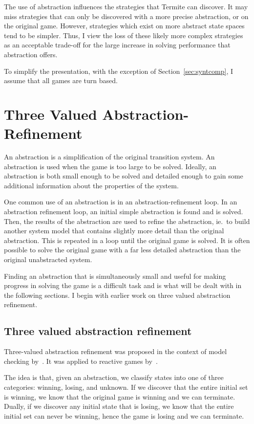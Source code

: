 The use of abstraction influences the strategies that Termite can discover. It may miss strategies that can only be discovered with a more precise abstraction, or on the original game. However, strategies which exist on more abstract state spaces tend to be simpler. Thus, I view the loss of these likely more complex strategies as an acceptable trade-off for the large increase in solving performance that abstraction offers.

To simplify the presentation, with the exception of Section~\ref{sec:syntcomp}, I assume that all games are turn based.



\section{Three Valued Abstraction-Refinement}
An abstraction is a simplification of the original transition system. An abstraction is used when the game is too large to be solved. Ideally, an abstraction is both small enough to be solved and detailed enough to gain some additional information about the properties of the system. 

One common use of an abstraction is in an abstraction-refinement loop. In an abstraction refinement loop, an initial simple abstraction is found and is solved. Then, the results of the abstraction are used to refine the abstraction, ie.\ to build another system model that contains slightly more detail than the original abstraction. This is repeated in a loop until the original game is solved. It is often possible to solve the original game with a far less detailed abstraction than the original unabstracted system. 

Finding an abstraction that is simultaneously small and useful for making progress in solving the game is a difficult task and is what will be dealt with in the following sections. I begin with earlier work on three valued abstraction refinement. 

\subsection{Three valued abstraction refinement}
\label{sec:three_val_abs_ref}
Three-valued abstraction refinement was proposed in the context of model checking by~\cite{Shoham1, Shoham2}. It was applied to reactive games by~\cite{Alfaro_GJ_04, Alfaro_Roy_07}.

The idea is that, given an abstraction, we classify states into one of three categories: winning, losing, and unknown. If we discover that the entire initial set is winning, we know that the original game is winning and we can terminate. Dually, if we discover any initial state that is losing, we know that the entire initial set can never be winning, hence the game is losing and we can terminate. 

